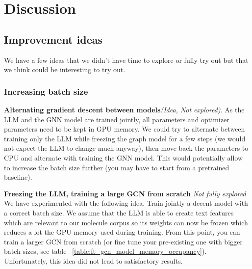 \section{Discussion}
\label{sec:discussion}

\subsection*{Improvement ideas}
\label{sec:unexplored_ideas}
We have a few ideas that we didn't have time to explore or fully try out but that we think could be interesting to try out.

\subsubsection*{Increasing batch size}
\label{sec:increase_batch_size}

\textbf{Alternating gradient descent between models}\textit{(Idea, Not explored)}. As the LLM and the GNN model are trained jointly, all parameters and optimizer parameters need to be kept in GPU memory. We could try to alternate between training only the LLM while freezing the graph model for a few steps (we would not expect the LLM to change much anyway), then move back the parameters to CPU and alternate with training the GNN model. This would potentially allow to increase the batch size further (you may have to start from a pretrained baseline).

\textbf{Freezing the LLM, training a large GCN from scratch} \textit{Not fully explored}
We have experimented with the following idea. Train jointly a decent model with a correct batch size. We assume that the LLM is able to create text features which are relevant to our molecule corpus so its weights can now be frozen which reduces a lot the GPU memory used during training. From this point, you can train a larger GCN from scratch (or fine tune your pre-existing one with bigger batch sizes, see table ~\ref{table:ft_gcn_model_memory_occupancy}). Unfortunately, this idea did not lead to satisfactory results.

